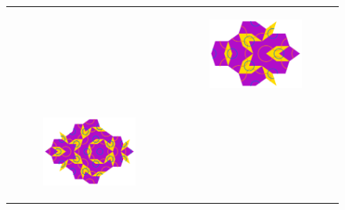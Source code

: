 \documentclass[]{article}
\begin{document}
\begin{figure}[H]
\begin{tabular}{cc}
\begin{subfigure}[b]{0.4\textwidth}
             \end{subfigure}   &
             \begin{subfigure}[b]{0.4\textwidth}
             \centering
             \includegraphics[scale=0.4]{FatInflation3}
             \end{subfigure}   \\
             \begin{subfigure}[b]{0.4\textwidth}
             \centering
             \includegraphics[scale=0.4]{FatInflation4}
             \end{subfigure}   &
             \begin{subfigure}[b]{0.4\textwidth}
             \centering

\end{subfigure}
\end{tabular}
\end{figure}
\end{document}

